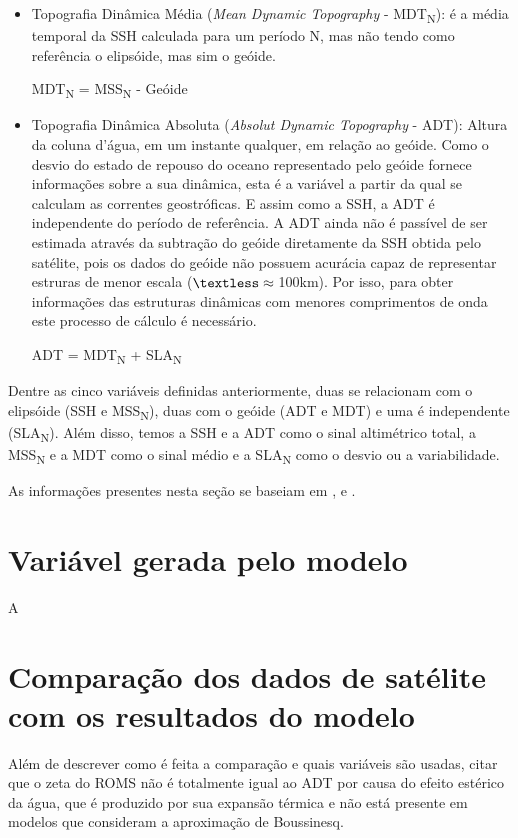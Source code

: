 \documentclass[12pt]{article}
\begin{document}
\begin{itemize}
		\item Topografia Dinâmica Média (\textit{Mean Dynamic Topography} - MDT\textsubscript{N}): é a média temporal da SSH calculada para um período N, mas não tendo como referência o elipsóide, mas sim o geóide.
		
		\begin{center}
			MDT\textsubscript{N} = MSS\textsubscript{N} - Geóide
		\end{center}	
		
		\item Topografia Dinâmica Absoluta (\textit{Absolut Dynamic Topography} - ADT): Altura da coluna d'água, em um instante qualquer, em relação ao geóide. Como o desvio do estado de repouso do oceano representado pelo geóide fornece informações sobre a sua dinâmica, esta é a variável a partir da qual se calculam as correntes geostróficas. E assim como a SSH, a ADT é independente do período de referência. A ADT ainda não é passível de ser estimada através da subtração do geóide diretamente da SSH obtida pelo satélite, pois os dados do geóide não possuem acurácia capaz de representar estruras de menor escala ($\textless\approx{}$100km). Por isso, para obter informações das estruturas dinâmicas com menores comprimentos de onda este processo de cálculo é necessário.
		
		\begin{center}
			ADT = MDT\textsubscript{N} + SLA\textsubscript{N}
		\end{center}	
		
	\end{itemize}
	
	\par Dentre as cinco variáveis definidas anteriormente, duas se relacionam com o elipsóide (SSH e MSS\textsubscript{N}), duas com o geóide (ADT e MDT) e uma é independente (SLA\textsubscript{N}). Além disso, temos a SSH e a ADT como o sinal altimétrico total, a MSS\textsubscript{N} e a MDT como o sinal médio e a SLA\textsubscript{N} como o desvio ou a variabilidade.
	\par As informações presentes nesta seção se baseiam em \citet{rosmorduc_etal2018}, \citet{duacs_web_faq2021} e \citet{taburet_etal2021}.

\section{Variável gerada pelo modelo}
	\par A

\section{Comparação dos dados de satélite com os resultados do modelo}
	\par Além de descrever como é feita a comparação e quais variáveis são usadas, citar que o zeta do ROMS não é totalmente igual ao ADT por causa do efeito estérico da água, que é produzido por sua expansão térmica e não está presente em modelos que consideram a aproximação de Boussinesq.
\end{document}
